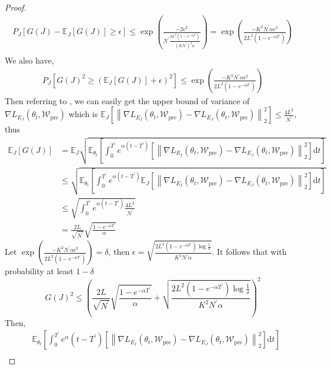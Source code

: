 \begin{proof}
$$\begin{aligned}
		P_J\left[G(J)-\mathbb{E}_J[G(J)]\geq \epsilon\right]\leq \exp\left(\frac{-2\epsilon^2}{N^\prime \frac{4L^2(1-e^{-\alpha {T^\prime}})}{{(KN^\prime)}^2\alpha}}\right)=\exp\left(\frac{-K^2N^\prime\alpha\epsilon^2}{2L^2(1-e^{-\alpha {T^\prime}})}\right) \\
	\end{aligned}
	$$
	We also have,
	$$
	\begin{aligned}
		P_J\left[G(J)^2 \geq (\mathbb{E}_J[G(J)]+\epsilon)^2\right]\leq \exp\left(\frac{-K^2N^\prime\alpha\epsilon^2}{2L^2(1-e^{-\alpha {T^\prime}})}\right)
	\end{aligned}
	$$
	Then referring to \cite{li2019generalization}, we can  easily get the upper bound of variance of $\nabla L_{E_J}(\theta_t, \mathcal{W}_{\text{pre}})$ which is $\mathbb{E}_J\left[\left\|\nabla L_{E_I}(\theta_t, \mathcal{W}_{\text{pre}})-\nabla L_{E_J}(\theta_t, \mathcal{W}_{\text{pre}})\right\|_2^2\right] \leq \frac{4L^2}{N^\prime}$, thus
	$$
	\begin{aligned}
		\mathbb{E}_{J}[G(J)]& =\mathbb{E}_J\sqrt{\mathbb{E}_{\theta_t}\left[\int_0^{T^\prime} e^{\alpha(t-{T^\prime})}\left[\left\|\nabla L_{E_I}(\theta_t, \mathcal{W}_{\text{pre}})-\nabla L_{E_J}(\theta_t, \mathcal{W}_{\text{pre}})\right\|_2^2\right]\mathrm{d}t\right]}  \\
		&\leq\sqrt{\mathbb{E}_{\theta_t}\left[\int_0^{T^\prime} e^{\alpha(t-{T^\prime})}\mathbb{E}_J\left[\left\|\nabla L_{E_I}(\theta_t, \mathcal{W}_{\text{pre}})-\nabla L_{E_J}(\theta_t, \mathcal{W}_{\text{pre}})\right\|_2^2\right]\mathrm{d}t\right]} \\
		&\leq\sqrt{\int_0^{T^\prime}e^{\alpha(t-{T^\prime})}\frac{4L^2}{N^\prime}} \\
		&=\frac{2L}{\sqrt{N^\prime}}\sqrt{\frac{1-e^{-\alpha {T^\prime}}}{\alpha}}
	\end{aligned}
	$$
	Let $\exp\left(\frac{-K^2N^\prime\alpha\epsilon^2}{2L^2(1-e^{-\alpha {T^\prime}})}\right)={\delta}$, then $\epsilon =\sqrt{\frac{ 2L^2(1-e^{-\alpha {T^\prime}}) \log \frac{1}{\delta}}{K^2N^\prime\alpha}}$. It follows that with probability at least $1-\delta$
	$$
	G(J)^2 \leq \left(\frac{2L}{\sqrt{N^\prime}}\sqrt{\frac{1-e^{-\alpha {T^\prime}}}{\alpha}}+\sqrt{\frac{ 2L^2(1-e^{-\alpha {T^\prime}}) \log \frac{1}{\delta}}{K^2N^\prime\alpha}}\right)^2
	$$
	Then,
	$$
	\begin{aligned}
		&\mathbb{E}_{\theta_t}\left[\int_0^{T^\prime} e^\alpha(t-{T^\prime})\left[\left\|\nabla L_{E_I}(\theta_t, \mathcal{W}_{\text{pre}})-\nabla L_{E_J}(\theta_t, \mathcal{W}_{\text{pre}})\right\|_2^2\right]\mathrm{d}t\right] \\

\end{aligned}$$
\end{proof}

